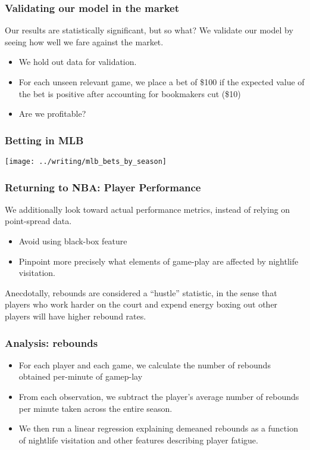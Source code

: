\documentclass{beamer}
\begin{document}
\begin{frame}   \frametitle{Validating our model in the market}
  Our results are statistically significant, but so what? We validate our model by seeing
  how well we fare against the market.

  \begin{itemize}     \item We hold out data for validation.
    \item For each unseen relevant game, we place a bet of \$100 if the expected value of the bet
      is positive after accounting for bookmakers cut (\$10)
    \item Are we profitable?
  \end{itemize} \end{frame}

\begin{frame}   \frametitle{Betting in MLB}
  \centering
  \texttt{[image: ../writing/mlb\_bets\_by\_season]} \end{frame}

\begin{frame}   \frametitle{Returning to NBA: Player Performance}
  We additionally look toward actual performance metrics, instead of relying on point-spread data.
  
  \begin{itemize}     \item Avoid using black-box feature
    \item Pinpoint more precisely what elements of game-play are affected by nightlife visitation.   \end{itemize}

  Anecdotally, rebounds are considered a ``hustle'' statistic, in the sense that players
  who work harder on the court and expend energy boxing out other players will have higher
  rebound rates. \end{frame}

\begin{frame}   \frametitle{Analysis: rebounds}
  \begin{itemize}     \item For each player and each game, we calculate the number of rebounds obtained per-minute of gamep-lay
    \item From each observation, we subtract the player's average number of rebounds per minute taken across the entire season.
    \item We then run a linear regression explaining demeaned rebounds as a function of 
      nightlife visitation and other features describing player fatigue.   \end{itemize} \end{frame}
\end{document}
